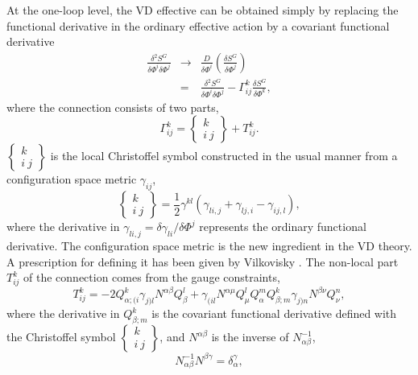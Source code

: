 \documentclass[a4paper,aps,preprint,groupedaddress,showpacs]{revtex4}
\begin{document}
At the one-loop level, the VD effective can be obtained simply
by replacing the functional derivative in the ordinary effective
action by a covariant functional derivative
\begin{eqnarray}
\frac{\delta^{2}S^{G}}{\delta\Phi^{i}\delta\Phi^{j}}
&\rightarrow&\frac{D}{\delta\Phi^{i}}
\left(\frac{\delta S^{G}}{\delta\Phi^{j}}\right)\nonumber\\
&=&\frac{\delta^{2}S^{G}}{\delta\Phi^{i}\delta\Phi^{j}}-
\Gamma^{k}_{ij}\frac{\delta S^{G}}{\delta\Phi^{k}},
\end{eqnarray}
where the connection consists of two parts,
\begin{equation}
\Gamma^{k}_{ij}=\left\{
\begin{array}{c}
k \\ i\ j
\end{array}\right\}+T^{k}_{ij}.
\end{equation}
$\left\{ \begin{array}{c} k \\ i\ j \end{array}\right\}$
is the local Christoffel symbol constructed in the usual manner
from a configuration space metric $\gamma_{ij}$, 
\begin{equation}
\left\{
\begin{array}{c}
k \\ i\ j
\end{array}\right\}=\frac{1}{2}\gamma^{kl}
(\gamma_{li,j}+\gamma_{lj,i}-\gamma_{ij,l}),
\end{equation}
where the derivative in 
$\gamma_{li,j}=\delta\gamma_{li}/\delta\Phi^{j}$ represents
the ordinary functional derivative. The configuration  space metric 
is the new ingredient in the VD theory. A prescription for defining
it  has been given by Vilkovisky \cite{GV}. The 
non-local part $T^{k}_{ij}$ of the connection comes from the gauge constraints,
\begin{equation}
T^{k}_{ij}=-2Q^{k}_{\alpha;(i}\gamma_{j)l}N^{\alpha\beta}
Q^{l}_{\beta}+\gamma_{(il}N^{\alpha\mu}Q^{l}_{\mu}Q^{m}_{\alpha}
Q^{k}_{\beta;m}\gamma_{j)n}N^{\beta\nu}Q^{n}_{\nu},
\end{equation}
where the derivative in $Q^{k}_{\beta;m}$ is the covariant 
functional derivative defined with the Christoffel symbol
$\left\{\begin{array}{c}k \\ i\ j\end{array}\right\}$, and
$N^{\alpha\beta}$ is the inverse of $N^{-1}_{\alpha\beta}$,
\begin{equation}
N^{-1}_{\alpha\beta}N^{\beta\gamma}=\delta^{\gamma}_{\alpha},
\end{equation}
\end{document}
